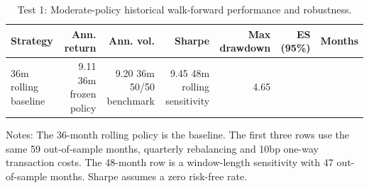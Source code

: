\begin{table}[htbp]
\centering
\footnotesize
\caption{Test 1: Moderate-policy historical walk-forward performance and robustness.}
\label{tab:gbi-historical-robustness}
\begin{tabular}{lrrrrrr}
\toprule
Strategy & Ann. return & Ann. vol. & Sharpe & Max drawdown & ES (95\%) & Months \\
\midrule
36m rolling baseline & 9.11%
36m frozen policy & 9.20%
36m 50/50 benchmark & 9.45%
48m rolling sensitivity & 4.65%
\bottomrule
\end{tabular}
\vspace{2pt}
\begin{minipage}{0.96\linewidth}
\footnotesize
Notes: The 36-month rolling policy is the baseline. The first three rows use the same 59 out-of-sample months, quarterly rebalancing and 10bp one-way transaction costs. The 48-month row is a window-length sensitivity with 47 out-of-sample months. Sharpe assumes a zero risk-free rate.
\end{minipage}
\end{table}
